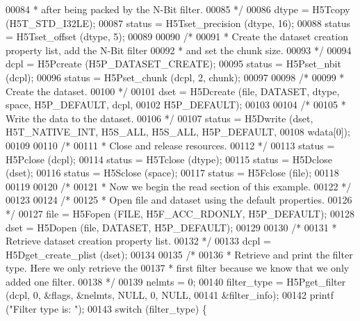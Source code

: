 \begin{DoxyCode}
00084 \textcolor{comment}{     * after being packed by the N-Bit filter.}
00085 \textcolor{comment}{     */}
00086     dtype = H5Tcopy (H5T\_STD\_I32LE);
00087     status = H5Tset\_precision (dtype, 16);
00088     status = H5Tset\_offset (dtype, 5);
00089 
00090     \textcolor{comment}{/*}
00091 \textcolor{comment}{     * Create the dataset creation property list, add the N-Bit filter}
00092 \textcolor{comment}{     * and set the chunk size.}
00093 \textcolor{comment}{     */}
00094     dcpl = H5Pcreate (H5P\_DATASET\_CREATE);
00095     status = H5Pset\_nbit (dcpl);
00096     status = H5Pset\_chunk (dcpl, 2, chunk);
00097 
00098     \textcolor{comment}{/*}
00099 \textcolor{comment}{     * Create the dataset.}
00100 \textcolor{comment}{     */}
00101     dset = H5Dcreate (file, DATASET, dtype, space, H5P\_DEFAULT, dcpl,
00102                 H5P\_DEFAULT);
00103 
00104     \textcolor{comment}{/*}
00105 \textcolor{comment}{     * Write the data to the dataset.}
00106 \textcolor{comment}{     */}
00107     status = H5Dwrite (dset, H5T\_NATIVE\_INT, H5S\_ALL, H5S\_ALL, H5P\_DEFAULT,
00108                 wdata[0]);
00109 
00110     \textcolor{comment}{/*}
00111 \textcolor{comment}{     * Close and release resources.}
00112 \textcolor{comment}{     */}
00113     status = H5Pclose (dcpl);
00114     status = H5Tclose (dtype);
00115     status = H5Dclose (dset);
00116     status = H5Sclose (space);
00117     status = H5Fclose (file);
00118 
00119 
00120     \textcolor{comment}{/*}
00121 \textcolor{comment}{     * Now we begin the read section of this example.}
00122 \textcolor{comment}{     */}
00123 
00124     \textcolor{comment}{/*}
00125 \textcolor{comment}{     * Open file and dataset using the default properties.}
00126 \textcolor{comment}{     */}
00127     file = H5Fopen (FILE, H5F\_ACC\_RDONLY, H5P\_DEFAULT);
00128     dset = H5Dopen (file, DATASET, H5P\_DEFAULT);
00129 
00130     \textcolor{comment}{/*}
00131 \textcolor{comment}{     * Retrieve dataset creation property list.}
00132 \textcolor{comment}{     */}
00133     dcpl = H5Dget\_create\_plist (dset);
00134 
00135     \textcolor{comment}{/*}
00136 \textcolor{comment}{     * Retrieve and print the filter type.  Here we only retrieve the}
00137 \textcolor{comment}{     * first filter because we know that we only added one filter.}
00138 \textcolor{comment}{     */}
00139     nelmts = 0;
00140     filter\_type = H5Pget\_filter (dcpl, 0, &flags, &nelmts, NULL, 0, NULL,
00141                 &filter\_info);
00142     printf (\textcolor{stringliteral}{"Filter type is: "});
00143     \textcolor{keywordflow}{switch} (filter\_type) \{

\end{DoxyCode}
